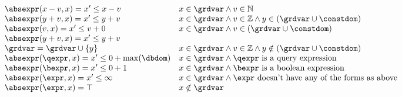   \[
    \begin{array}{ll} 
      \absexpr(x - v, x)  = x' \leq x - v  & x \in \grdvar \land v \in \mathbb{N} \\
      \absexpr(y + v, x)  = x' \leq y + v  & x \in \grdvar \land v \in \mathbb{Z} \land y \in (\grdvar \cup \constdom) \\
      \absexpr(v, x)  = x' \leq v + 0  & x \in \grdvar \land v \in (\grdvar \cup \constdom) \\
      \absexpr(y + v, x)  = x' \leq y + v & \\
      \grdvar = \grdvar \cup \{y\} & x \in \grdvar \land v \in \mathbb{Z} \land y \notin (\grdvar \cup \constdom)  \\
      \absexpr(\qexpr, x)  = x' \leq 0 + \max(\dbdom) & x \in \grdvar \land \qexpr \text{ is a query expression}  \\
      \absexpr(\bexpr, x) = x' \leq 0 + 1   & x \in \grdvar \land \bexpr \text{ is a boolean expression} \\
      \absexpr(\expr, x) = x' \leq \infty  &  x \in \grdvar \land \expr \text{ doesn't have any of the forms as above} \\
      \absexpr(\expr, x) = \top  &  x \notin \grdvar \\
    \end{array}
    \]
  
